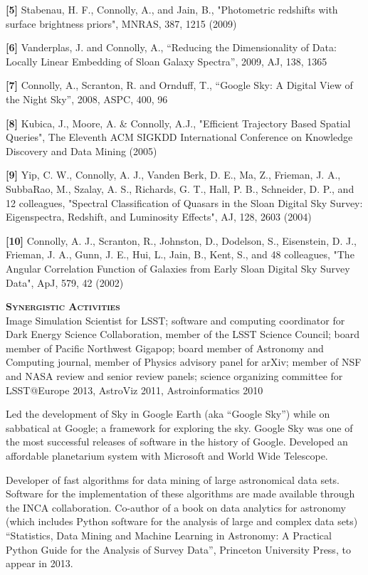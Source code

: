 \documentclass[12pt,tightenlines]{revtex4} %
\begin{document}
\noindent
{\bf[5]} Stabenau, H. F., Connolly, A., and Jain, B., "Photometric redshifts
with surface brightness priors", MNRAS, 387, 1215 (2009)

\noindent
{\bf[6]} Vanderplas, J. and Connolly, A.,  ``Reducing the Dimensionality of Data: Locally Linear Embedding of Sloan Galaxy Spectra'', 2009,  AJ,  138,  1365 

\noindent
{\bf[7]} Connolly, A., Scranton, R. and Ornduff, T., ``Google Sky: A Digital View of the Night Sky'', 2008,  ASPC,  400,  96 

\noindent
{\bf[8]} Kubica, J., Moore, A. \& Connolly, A.J., "Efficient Trajectory Based
Spatial Queries", The Eleventh ACM SIGKDD International
Conference on Knowledge Discovery and Data Mining (2005)

\noindent
{\bf[9]} Yip, C. W., Connolly, A.  J., Vanden Berk, D. E., Ma, Z., Frieman,
J. A., SubbaRao, M., Szalay, A.  S., Richards, G. T., Hall, P. B.,
Schneider, D. P., and 12 colleagues, "Spectral Classification of
Quasars in the Sloan Digital Sky Survey: Eigenspectra, Redshift, and
Luminosity Effects", AJ, 128, 2603 (2004)

\noindent
{\bf[10]} Connolly, A. J., Scranton, R., Johnston, D.,
Dodelson, S., Eisenstein, D. J., Frieman, J. A., Gunn, J. E., Hui, L.,
Jain, B., Kent, S., and 48 colleagues,  "The Angular Correlation Function of Galaxies from Early Sloan Digital Sky Survey Data", ApJ,  579,  42 (2002)


\newpage
\noindent
{\bf \scshape Synergistic Activities}\\
 Image Simulation Scientist
for LSST; software and computing coordinator for Dark Energy Science
Collaboration, member of the LSST Science Council; board member of Pacific
Northwest Gigapop; board member of Astronomy and Computing journal, 
member of Physics advisory panel for arXiv; member
of NSF and NASA review and senior review panels; science organizing
committee for LSST@Europe 2013, AstroViz 2011, Astroinformatics 2010

 Led the development of Sky in Google
Earth (aka ``Google Sky'') while on sabbatical at Google; a framework
for exploring the sky. Google Sky was one of the most successful
releases of software in the history of Google. Developed an affordable
planetarium system with Microsoft and World Wide Telescope.

 Developer of fast algorithms for
data mining of large astronomical data sets. Software for the
implementation of these algorithms are made available through the INCA
collaboration. Co-author of a book on data analytics for astronomy
(which includes Python software for the analysis of large and complex
data sets) ``Statistics, Data Mining and Machine Learning in
Astronomy: A Practical Python Guide for the Analysis of Survey Data'',
Princeton University Press, to appear in 2013.
\end{document}
